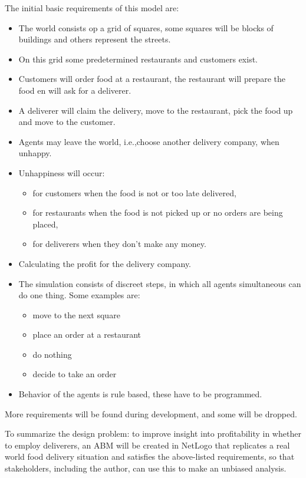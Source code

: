 
The initial basic requirements of this model are:

\begin{itemize}
    \item   The world consists op a grid of squares, some squares will be blocks of buildings and others represent the streets.
    \item   On this grid some predetermined restaurants and customers exist.
    \item   Customers will order food at a restaurant, the restaurant will prepare the food en will ask for a deliverer.
    \item   A deliverer will claim the delivery, move to the restaurant, pick the food up and move to the customer.
    \item   Agents may leave the world, i.e.,choose another delivery company, when unhappy.
    \item   Unhappiness will occur:
    \begin{itemize}
        \item   for customers when the food is not or too late delivered,
        \item   for restaurants when the food is not picked up or no orders are being placed,
        \item   for deliverers when they don't make any money.
    \end{itemize}
    \item    Calculating the profit for the delivery company.
    \item    The simulation consists of discreet steps, in which all agents simultaneous can do one thing.
    Some examples are:
    \begin{itemize}
        \item  move to the next square
        \item  place an order at a restaurant
        \item  do nothing
        \item  decide to take an order
    \end{itemize}
    \item   Behavior of the agents is rule based, these have to be programmed.
\end{itemize}

More requirements will be found during development, and some will be dropped.

To summarize the design problem: to improve insight into profitability in whether to employ deliverers,
an ABM will be created in NetLogo that replicates a real world food delivery situation and satisfies the above-listed requirements,
so that stakeholders, including the author, can use this to make an unbiased analysis.



